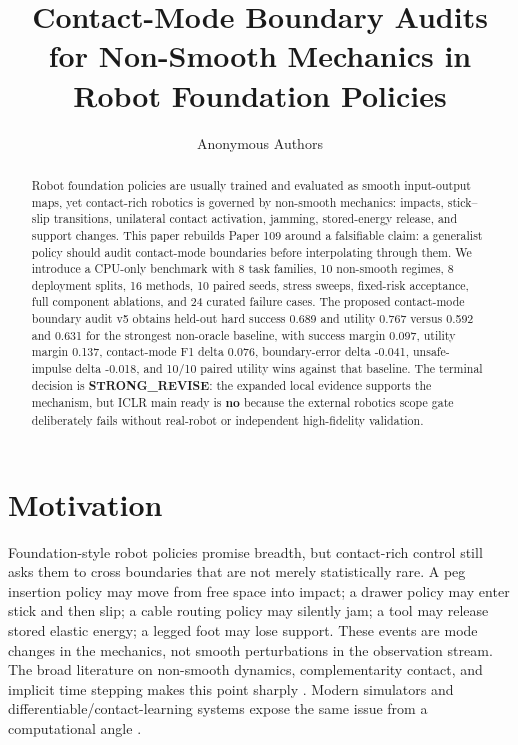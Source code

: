 \documentclass{article}
\title{Contact-Mode Boundary Audits for Non-Smooth Mechanics in Robot Foundation Policies}
\author{Anonymous Authors}
\newcommand{\method}{contact-mode boundary audit v5}
\newcommand{\terminal}{\textbf{STRONG\_REVISE}}
\begin{document}
\maketitle

\begin{abstract}
Robot foundation policies are usually trained and evaluated as smooth input-output maps, yet contact-rich robotics is governed by non-smooth mechanics: impacts, stick--slip transitions, unilateral contact activation, jamming, stored-energy release, and support changes. This paper rebuilds Paper 109 around a falsifiable claim: a generalist policy should audit contact-mode boundaries before interpolating through them. We introduce a CPU-only benchmark with 8 task families, 10 non-smooth regimes, 8 deployment splits, 16 methods, 10 paired seeds, stress sweeps, fixed-risk acceptance, full component ablations, and 24 curated failure cases. The proposed \method{} obtains held-out hard success 0.689 and utility 0.767 versus 0.592 and 0.631 for the strongest non-oracle baseline, with success margin 0.097, utility margin 0.137, contact-mode F1 delta 0.076, boundary-error delta -0.041, unsafe-impulse delta -0.018, and 10/10 paired utility wins against that baseline. The terminal decision is \terminal: the expanded local evidence supports the mechanism, but ICLR main ready is \textbf{no} because the external robotics scope gate deliberately fails without real-robot or independent high-fidelity validation.
\end{abstract}

\section{Motivation}
Foundation-style robot policies promise breadth, but contact-rich control still asks them to cross boundaries that are not merely statistically rare. A peg insertion policy may move from free space into impact; a drawer policy may enter stick and then slip; a cable routing policy may silently jam; a tool may release stored elastic energy; a legged foot may lose support. These events are mode changes in the mechanics, not smooth perturbations in the observation stream. The broad literature on non-smooth dynamics, complementarity contact, and implicit time stepping makes this point sharply \citep{moreau1999nonsmooth,moreau1999contact,stewart1996implicit,anitescu1997formulating}. Modern simulators and differentiable/contact-learning systems expose the same issue from a computational angle \citep{todorov2012mujoco,pfrommer2020contactnets,posa2014direct}.
\end{document}
